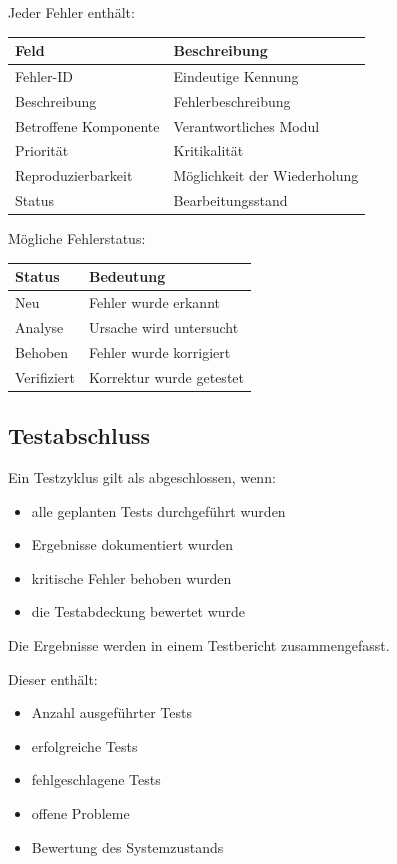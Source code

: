 \documentclass[
  a4paper,
  12pt,
  DIV=12,        %
  parskip=half,  %
  headings=small %
]{scrartcl}
\theoremstyle{definition}
\providecommand{\tightlist}{%
  \setlength{\itemsep}{0pt}\setlength{\parskip}{0pt}}
\theoremstyle{definition}
\begin{document}
Jeder Fehler enthält:

\begin{longtable}[]{@{}ll@{}}
\toprule\noalign{}
Feld & Beschreibung \\
\midrule\noalign{}
\endhead
\bottomrule\noalign{}
\endlastfoot
Fehler-ID & Eindeutige Kennung \\
Beschreibung & Fehlerbeschreibung \\
Betroffene Komponente & Verantwortliches Modul \\
Priorität & Kritikalität \\
Reproduzierbarkeit & Möglichkeit der Wiederholung \\
Status & Bearbeitungsstand \\
\end{longtable}

Mögliche Fehlerstatus:

\begin{longtable}[]{@{}ll@{}}
\toprule\noalign{}
Status & Bedeutung \\
\midrule\noalign{}
\endhead
\bottomrule\noalign{}
\endlastfoot
Neu & Fehler wurde erkannt \\
Analyse & Ursache wird untersucht \\
Behoben & Fehler wurde korrigiert \\
Verifiziert & Korrektur wurde getestet \\
\end{longtable}

\subsection{Testabschluss}\label{testabschluss}

Ein Testzyklus gilt als abgeschlossen, wenn:

\begin{itemize}
\tightlist
\item
  alle geplanten Tests durchgeführt wurden
\item
  Ergebnisse dokumentiert wurden
\item
  kritische Fehler behoben wurden
\item
  die Testabdeckung bewertet wurde
\end{itemize}

Die Ergebnisse werden in einem Testbericht zusammengefasst.

Dieser enthält:

\begin{itemize}
\tightlist
\item
  Anzahl ausgeführter Tests
\item
  erfolgreiche Tests
\item
  fehlgeschlagene Tests
\item
  offene Probleme
\item
  Bewertung des Systemzustands
\end{itemize}
\end{document}
